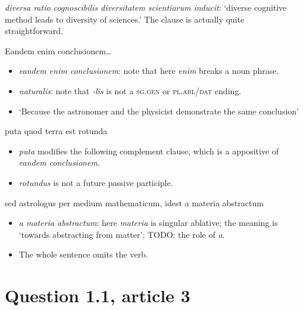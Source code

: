 \documentclass[a4paper, 12pt]{article}
\newcommand{\form}[1]{\emph{#1}}
\newcommand*{\category}[1]{\textsc{#1}}
\newcommand{\translate}[1]{`#1'}
\begin{document}
\begin{exe}
    \ex \form{diversa ratio cognoscibilis diversitatem scientiarum inducit}: 
    \translate{diverse cognitive method leads to diversity of sciences.}
    The clause is actually quite straightforward.
\end{exe}

\begin{exe}
    \ex Eandem enim conclusionem\dots
\end{exe}

\begin{itemize}
    \item \form{eandem enim conclusionem}: 
    note that here \form{enim} breaks a noun phrase.
    \item \form{naturalis}: note that \form{-lis} is not a \category{sg.gen} or \category{pl.abl/dat} ending.
    \item \translate{Because the astronomer and the physicist demonstrate the same conclusion}
\end{itemize}

\begin{exe}
    \ex puta quod terra est rotunda
\end{exe}

\begin{itemize}
    \item \form{puta} modifies the following complement clause, 
    which is a appositive of \form{eandem conclusionem}.
    \item \form{rotundus} is not a future passive participle.
\end{itemize}

\begin{exe}
    \ex sed astrologus per medium mathematicum, idest a materia abstractum 
\end{exe}

\begin{itemize}
    \item \form{a materia abstractum}: 
    here \form{materia} is singular ablative; 
    the meaning is \translate{towards abstracting from matter}; 
    TODO: the role of \form{a}.
    \item The whole sentence omits the verb.
\end{itemize}


\section{Question 1.1, article 3}
\end{document}
